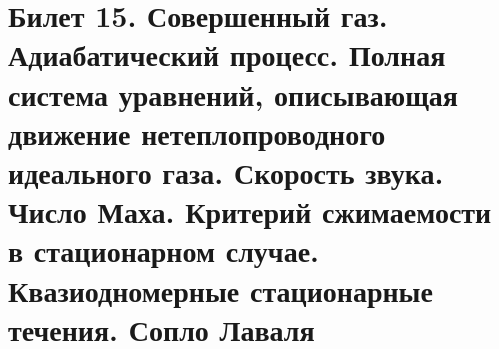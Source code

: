 \newpage
\section{Билет 15. Совершенный газ. Адиабатический процесс. Полная система уравнений, описывающая движение нетеплопроводного идеального газа. Скорость звука. Число Маха. Критерий сжимаемости в стационарном случае. Квазиодномерные стационарные течения. Сопло Лаваля}